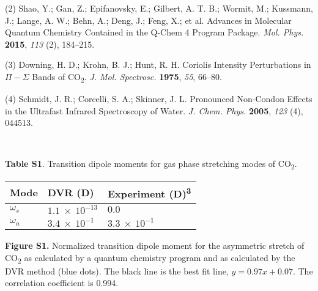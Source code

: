 \documentclass[]{article}
\begin{document}
(2) Shao, Y.; Gan, Z.; Epifanovsky, E.; Gilbert, A. T. B.; Wormit, M.;
Kussmann, J.; Lange, A. W.; Behn, A.; Deng, J.; Feng, X.; et al.
Advances in Molecular Quantum Chemistry Contained in the Q-Chem 4
Program Package. \emph{Mol. Phys.} \textbf{2015}, \emph{113} (2),
184--215.

(3) Downing, H. D.; Krohn, B. J.; Hunt, R. H. Coriolis Intensity
Perturbations in \(\Pi - \Sigma\) Bands of CO\textsubscript{2}. \emph{J.
Mol. Spectrosc.} \textbf{1975}, \emph{55}, 66--80.

(4) Schmidt, J. R.; Corcelli, S. A.; Skinner, J. L. Pronounced
Non-Condon Effects in the Ultrafast Infrared Spectroscopy of Water.
\emph{J. Chem. Phys.} \textbf{2005}, \emph{123} (4), 044513.

\textbf{\\
}

\textbf{Table S1}. Transition dipole moments for gas phase stretching
modes of CO\textsubscript{2}.

\begin{longtable}[]{@{}lll@{}}
\toprule
Mode & DVR (D) & Experiment (D)\textsuperscript{3}\tabularnewline
\midrule
\endhead
\(\omega_{s}\) & \(1.1\  \times \ 10^{- 13}\) & \(0.0\)\tabularnewline
\(\omega_{a}\) & \(3.4\  \times \ 10^{- 1}\) &
\(3.3\  \times \ 10^{- 1}\)\tabularnewline
\bottomrule
\end{longtable}


\textbf{Figure S1.} Normalized transition dipole moment for the
asymmetric stretch of CO\textsubscript{2} as calculated by a quantum
chemistry program and as calculated by the DVR method (blue dots). The
black line is the best fit line, \(y = 0.97x + 0.07\). The correlation
coefficient is 0.994.
\end{document}
